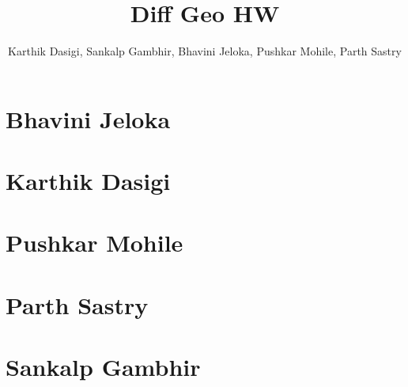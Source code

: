 \documentclass[aspectratio=169, handout]{beamer}
\title{Diff Geo HW}
\author{ %
    Karthik Dasigi,
    Sankalp Gambhir,
    Bhavini Jeloka,
    Pushkar Mohile, 
    Parth Sastry
}
\begin{document}
    \frame{\titlepage}

    \section{Bhavini Jeloka}
    
    

    \section{Karthik Dasigi}
    
    

    \section{Pushkar Mohile}
    

    \section{Parth Sastry}
    
    

    \section{Sankalp Gambhir}
    
    
\end{document}
